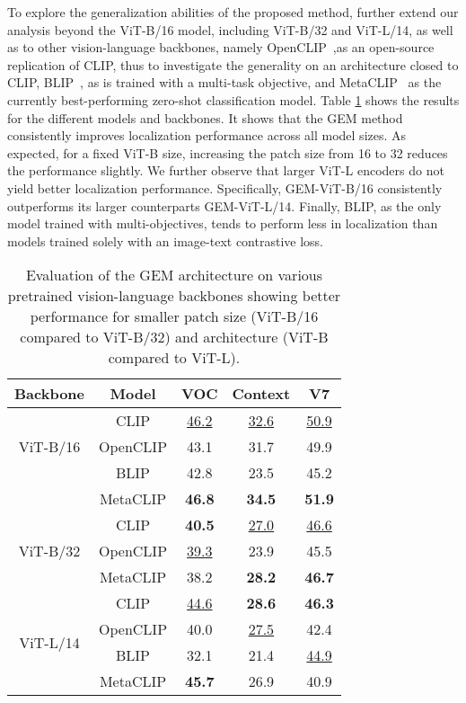 \documentclass[10pt,twocolumn,letterpaper]{article}
\begin{document}
To explore the generalization abilities of the proposed method,  further extend our analysis beyond the ViT-B/16 model, including ViT-B/32 and ViT-L/14, as well as to other vision-language backbones, namely OpenCLIP~\citep{schuhmann2022laion},as an open-source replication of CLIP, thus to investigate the generality on an architecture closed to CLIP, BLIP~\citep{li2022blip}, as is trained with a multi-task objective, and MetaCLIP~\citep{xu2023demystifying} as the currently best-performing zero-shot classification model.
Table \ref{tab:model_sizes+architectures} shows the results for the different models and backbones. 
It shows that the GEM method consistently improves localization performance across all model sizes. As expected, for a fixed ViT-B size, increasing the patch size from 16 to 32 reduces the performance slightly. We further observe that larger ViT-L encoders do not yield better localization performance. Specifically, GEM-ViT-B/16 consistently outperforms its larger counterparts GEM-ViT-L/14.
Finally, BLIP, as the only model trained with multi-objectives, tends to perform less in localization than models trained solely with an image-text contrastive loss.
\begin{table}\centering
\footnotesize
\begin{tabular}{c|c|ccc}
\toprule
Backbone & Model & VOC & Context & V7 \\ \hline 
\multirow{3}{*}{ViT-B/16}   &  CLIP &  \underline{46.2} &   \underline{32.6} &   \underline{50.9} \\
                            &OpenCLIP  & 43.1 &  31.7 &  49.9\\
                            &BLIP  & 42.8 &  23.5 & 45.2\\
                            &MetaCLIP  & \textbf{46.8} &   \textbf{34.5} & \textbf{51.9}\\
\hline 
\multirow{3}{*}{ViT-B/32}   &CLIP  & \textbf{40.5} & \underline{27.0} & \underline{46.6}\\
                            &OpenCLIP  & \underline{39.3} &  23.9 & 45.5\\
                            &MetaCLIP  & 38.2 &   \textbf{28.2} & \textbf{46.7} \\
\hline
\multirow{4}{*}{ViT-L/14}   &CLIP  & \underline{44.6} &  \textbf{28.6}& \textbf{46.3} \\
                            &OpenCLIP  & 40.0 &  \underline{27.5} & 42.4\\
                            &BLIP  & 32.1 &  21.4 & \underline{44.9}\\
                            &MetaCLIP  & \textbf{45.7} &  26.9 & 40.9\\
\bottomrule
\end{tabular}
\caption{Evaluation of the GEM architecture on various pretrained vision-language backbones showing better performance for smaller patch size (ViT-B/16 compared to ViT-B/32) and architecture (ViT-B compared to ViT-L).}\label{tab:model_sizes+architectures}
\vspace{-5mm}
\end{table}
\end{document}
